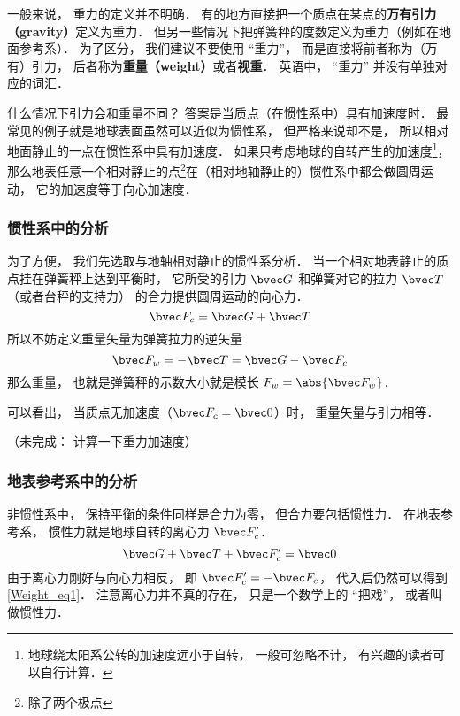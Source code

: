 

一般来说， 重力的定义并不明确． 有的地方直接把一个质点在某点的\textbf{万有引力（gravity）}定义为重力． 但另一些情况下把弹簧秤的度数定义为重力（例如在地面参考系）． 为了区分， 我们建议不要使用 “重力”， 而是直接将前者称为（万有）引力， 后者称为\textbf{重量（weight）}或者\textbf{视重}． 英语中， “重力” 并没有单独对应的词汇．

什么情况下引力会和重量不同？ 答案是当质点（在惯性系中）具有加速度时． 最常见的例子就是地球表面虽然可以近似为惯性系， 但严格来说却不是， 所以相对地面静止的一点在惯性系中具有加速度． 如果只考虑地球的自转产生的加速度\footnote{地球绕太阳系公转的加速度远小于自转， 一般可忽略不计， 有兴趣的读者可以自行计算．}， 那么地表任意一个相对静止的点\footnote{除了两个极点}在（相对地轴静止的）惯性系中都会做圆周运动， 它的加速度等于向心加速度．

\subsubsection{惯性系中的分析}
为了方便， 我们先选取与地轴相对静止的惯性系分析． 当一个相对地表静止的质点挂在弹簧秤上达到平衡时， 它所受的引力 $\bvec G$ 和弹簧对它的拉力 $\bvec T$（或者台秤的支持力） 的合力提供圆周运动的向心力．
\begin{equation}\label{Weight_eq1}
\bvec F_c = \bvec G + \bvec T
\end{equation}
所以不妨定义重量矢量为弹簧拉力的逆矢量
\begin{equation}
\bvec F_w = -\bvec T = \bvec G - \bvec F_c
\end{equation}
那么重量， 也就是弹簧秤的示数大小就是模长 $F_w = \abs{\bvec F_w}$．

可以看出， 当质点无加速度（$\bvec F_c = \bvec 0$）时， 重量矢量与引力相等．

（未完成： 计算一下重力加速度）

\subsubsection{地表参考系中的分析}
非惯性系中， 保持平衡的条件同样是合力为零， 但合力要包括惯性力． 在地表参考系， 惯性力就是地球自转的离心力 $\bvec F'_c$．
\begin{equation}
\bvec G + \bvec T + \bvec F'_c = \bvec 0
\end{equation}
由于离心力刚好与向心力相反， 即 $\bvec F'_c = -\bvec F_c$， 代入后仍然可以得到\autoref{Weight_eq1}． 注意离心力并不真的存在， 只是一个数学上的 “把戏”， 或者叫做惯性力．
